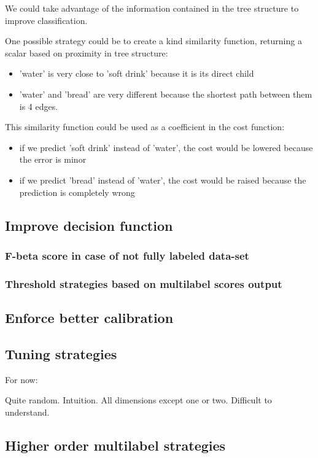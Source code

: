 We could take advantage of the information contained in the tree structure to improve classification. 

One possible strategy could be to create a kind similarity function, returning a scalar based on proximity in tree structure:
\begin{itemize}
	\item 'water' is very close to 'soft drink' because it is its direct child
	\item 'water' and 'bread' are very different because the shortest path between them is 4 edges.
\end{itemize}

This similarity function could be used as a coefficient in the cost function: 
\begin{itemize}
	\item if we predict 'soft drink' instead of 'water', the cost would be lowered because the error is minor
	\item if we predict 'bread' instead of 'water', the cost would be raised because the prediction is completely wrong
\end{itemize}


\subsection{Improve decision function}
\subsubsection{F-beta score in case of not fully labeled data-set}
\subsubsection{Threshold strategies based on multilabel scores output}

\subsection{Enforce better calibration}
\subsection{Tuning strategies}

For now: 

Quite random. Intuition. All dimensions except one or two. Difficult to understand.

\subsection{Higher order multilabel strategies}
